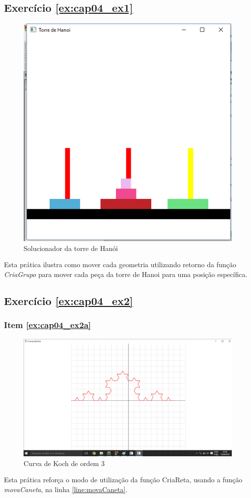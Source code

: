 \subsection*{Exercício \ref{ex:cap04_ex1} }
\begin{figure}[ht]
  \centerline{\includegraphics[width=.5\textwidth]{img/cap4_ex13.png}}
  \caption{Solucionador da torre de Hanói}
  \label{fig:cap04_ex1}
\end{figure}
Esta prática ilustra como mover cada geometria utilizando retorno da função \emph{CriaGrupo} para mover cada peça da torre de Hanoi para uma posição específica.


\subsection*{Exercício \ref{ex:cap04_ex2} }
\subsubsection*{Item \ref{ex:cap04_ex2a}}
\begin{figure}[ht]
  \centerline{\includegraphics[width=.5\textwidth]{img/cap4_ex14.png}}
  \caption{Curva de Koch de ordem 3}
  \label{fig:cap04_ex2a}
\end{figure}
Esta prática reforça o modo de utilização da função CriaReta, usando a função \emph{movaCaneta}, na linha \ref{line:movaCaneta}.


